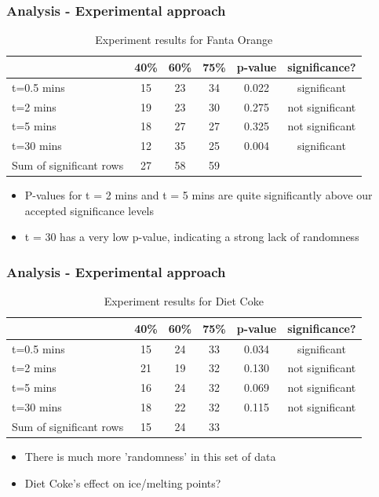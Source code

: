 \documentclass[compress,handout,10pt]{beamer}
\let\olditem\item
\renewcommand{\item}{\setlength{\itemsep}{0.5\baselineskip}\olditem}
\begin{document}
\begin{frame}
    \frametitle{Analysis - Experimental approach}
\begin{table}[ h]
\centering
\begin{tabular}{ l || c|c|c||c|c }
  &40\% &60\% & 75\% &p-value &significance? \\
\hline  
t=0.5 mins & 15 & 23 & 34&0.022&significant\\ 
\hline  
t=2 mins & 19 & 23 & 30&0.275&not significant\\ 
\hline  
t=5 mins & 18 & 27 & 27&0.325&not significant\\ 
\hline  
t=30 mins & 12 & 35 & 25&0.004&significant\\ 
\hline     
Sum of significant rows & 27 & 58 & 59 & & \\ 
\hline     
 \end{tabular}
\caption{Experiment results for Fanta Orange}

\end{table}

\begin{itemize}
\item P-values for t = 2 mins and t = 5 mins are quite significantly above our accepted significance levels
\item t = 30 has a very low p-value, indicating a strong lack of randomness
\end{itemize}
\end{frame}

\begin{frame}
    \frametitle{Analysis - Experimental approach}
\begin{table}[ h]
\centering
\begin{tabular}{ l || c|c|c||c|c }
  &40\% &60\% & 75\% &p-value &significance? \\
\hline  
t=0.5 mins & 15 & 24 & 33&0.034&significant\\ 
\hline  
t=2 mins & 21& 19 & 32&0.130 &not significant\\ 
\hline  
t=5 mins & 16 & 24 & 32&0.069&not significant\\ 
\hline  
t=30 mins & 18 & 22& 32&0.115&not significant\\ 
\hline  
Sum of significant rows & 15 & 24 & 33 & & \\ 
\hline     
 \end{tabular}
\caption{Experiment results for Diet Coke}
\end{table}

\begin{itemize}
\item There is much more 'randomness' in this set of data
\item Diet Coke's effect on ice/melting points?
\end{itemize}
\end{frame}
\end{document}
